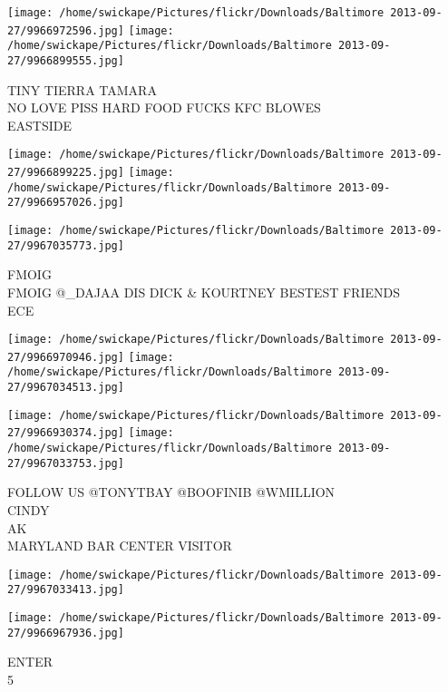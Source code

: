\documentclass[10pt,letterpaper]{article}
\begin{document}
\vspace{0.25in}
\texttt{[image: /home/swickape/Pictures/flickr/Downloads/Baltimore 2013-09-27/9966972596.jpg]}
\texttt{[image: /home/swickape/Pictures/flickr/Downloads/Baltimore 2013-09-27/9966899555.jpg]}

TINY TIERRA TAMARA\\
NO LOVE PISS HARD FOOD FUCKS KFC BLOWES\\
EASTSIDE\\
\pagebreak

\texttt{[image: /home/swickape/Pictures/flickr/Downloads/Baltimore 2013-09-27/9966899225.jpg]}
\texttt{[image: /home/swickape/Pictures/flickr/Downloads/Baltimore 2013-09-27/9966957026.jpg]}

\vspace{0.25in}
\texttt{[image: /home/swickape/Pictures/flickr/Downloads/Baltimore 2013-09-27/9967035773.jpg]}

FMOIG\\
FMOIG @\_DAJAA DIS DICK \& KOURTNEY BESTEST FRIENDS\\
ECE\\
\pagebreak

\texttt{[image: /home/swickape/Pictures/flickr/Downloads/Baltimore 2013-09-27/9966970946.jpg]}
\texttt{[image: /home/swickape/Pictures/flickr/Downloads/Baltimore 2013-09-27/9967034513.jpg]}

\texttt{[image: /home/swickape/Pictures/flickr/Downloads/Baltimore 2013-09-27/9966930374.jpg]}
\texttt{[image: /home/swickape/Pictures/flickr/Downloads/Baltimore 2013-09-27/9967033753.jpg]}

FOLLOW US @TONYTBAY @BOOFINIB @WMILLION\\
CINDY\\
AK\\
MARYLAND BAR CENTER VISITOR\\
\pagebreak

\texttt{[image: /home/swickape/Pictures/flickr/Downloads/Baltimore 2013-09-27/9967033413.jpg]}

\vspace{0.25in}
\texttt{[image: /home/swickape/Pictures/flickr/Downloads/Baltimore 2013-09-27/9966967936.jpg]}

ENTER\\
5\\
\pagebreak
\end{document}
